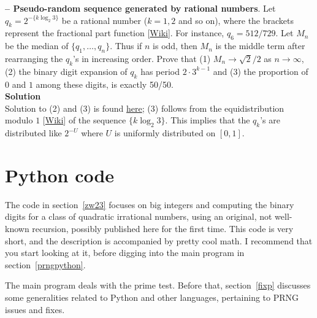 \documentclass[oneside,10pt]{book}
\renewcommand{\arraystretch}{1.4} %
\begin{document}
\begin{Exercise}\label{q23}{\bf -- Pseudo-random sequence generated by rational numbers}. Let $q_k=2^{-\{k\log_2 3\}}$ be a rational number ($k=1,2$ and so on), where the brackets represent 
the \textcolor{index}{fractional part function} [\href{https://en.wikipedia.org/wiki/Fractional_part}{Wiki}]. 
For instance, $q_6=512/729$. Let $M_n$ be the median of
$\{q_1,\dots,q_n\}$. Thus if $n$ is odd, then $M_n$ is the middle term after rearranging the $q_k$'s in increasing order. Prove
 that (1) $M_n\rightarrow\sqrt{2}/2$ as $n\rightarrow\infty$, (2) the binary digit expansion of $q_k$ has period $2\cdot 3^{k-1}$ and (3) the proportion of  $0$ and $1$ among these digits, is exactly 50/50.
\vspace{1ex} \\
{\bf Solution} \vspace{1ex} \\
Solution to (2) and (3) is found \href{https://math.stackexchange.com/questions/3310862/what-is-the-period-of-the-fraction-1-3k-in-base-2-for-k-1-2-dots}{here}; (3) follows from the \textcolor{index}{equidistribution modulo $1$} [\href{https://en.wikipedia.org/wiki/Equidistribution_theorem}{Wiki}] 
of the sequence $\{ k \log_2 3\}$.
This implies that the $q_k$'s are distributed like $2^{-U}$ where $U$ is uniformly distributed on $[0, 1]$.
\end{Exercise}

\renewcommand{\arraystretch}{1.0} %
\renewcommand{\arraystretch}{1.4} %

\section{Python code}\label{pythonviz}

The code in section~\ref{zw23} focuses on big integers and computing the binary digits for a class of quadratic irrational numbers,
  using an original, not well-known recursion, possibly published here for the first time. This code is very short, and the description is accompanied 
 by pretty cool math. I recommend that you start  looking at it, before digging into the main program in section~\ref{prngpython}.

The main program deals with the prime test. Before that, section~\ref{fixp} discusses some generalities related to Python and other languages,
 pertaining to PRNG issues and fixes.  
\end{document}
